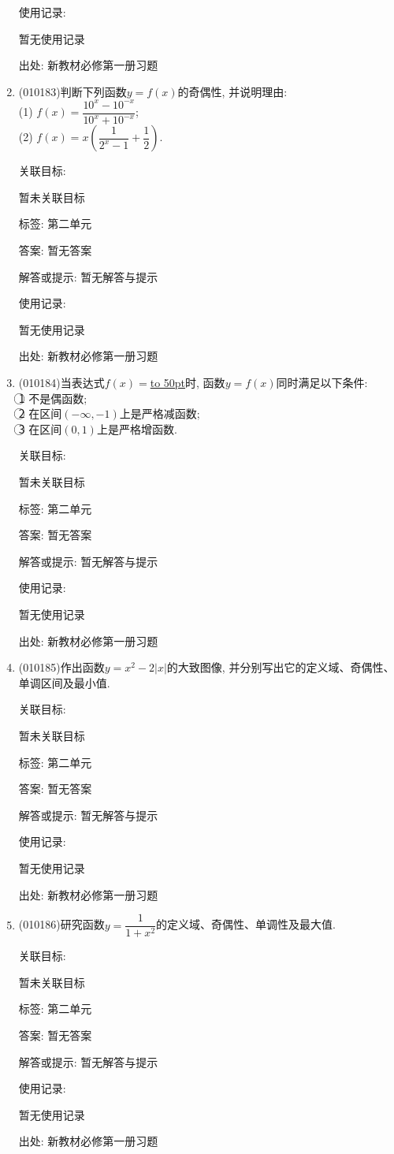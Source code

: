 \documentclass[10pt,a4paper]{article}
\newcommand{\blank}[1]{\underline{\hbox to #1pt{}}}
\begin{document}
\begin{enumerate}[1.]
使用记录:

暂无使用记录


出处: 新教材必修第一册习题
\item { (010183)}判断下列函数$y=f(x)$的奇偶性, 并说明理由:\\
(1) $f(x)=\dfrac{10^x-10^{-x}}{10^x+10^{-x}}$;\\
(2) $f(x)=x(\dfrac 1{2^x-1}+\dfrac 12)$.


关联目标:

暂未关联目标



标签: 第二单元

答案: 暂无答案

解答或提示: 暂无解答与提示

使用记录:

暂无使用记录


出处: 新教材必修第一册习题
\item { (010184)}当表达式$f(x)=$\blank{50}时, 函数$y=f(x)$同时满足以下条件:\\
\textcircled{1} 不是偶函数;\\
\textcircled{2} 在区间$(-\infty, -1)$上是严格减函数;\\
\textcircled{3} 在区间$(0, 1)$上是严格增函数.


关联目标:

暂未关联目标



标签: 第二单元

答案: 暂无答案

解答或提示: 暂无解答与提示

使用记录:

暂无使用记录


出处: 新教材必修第一册习题
\item { (010185)}作出函数$y=x^2-2|x|$的大致图像, 并分别写出它的定义域、奇偶性、单调区间及最小值.


关联目标:

暂未关联目标



标签: 第二单元

答案: 暂无答案

解答或提示: 暂无解答与提示

使用记录:

暂无使用记录


出处: 新教材必修第一册习题
\item { (010186)}研究函数$y=\dfrac1{1+x^2}$的定义域、奇偶性、单调性及最大值.


关联目标:

暂未关联目标



标签: 第二单元

答案: 暂无答案

解答或提示: 暂无解答与提示

使用记录:

暂无使用记录


出处: 新教材必修第一册习题
\end{enumerate}
\end{document}
